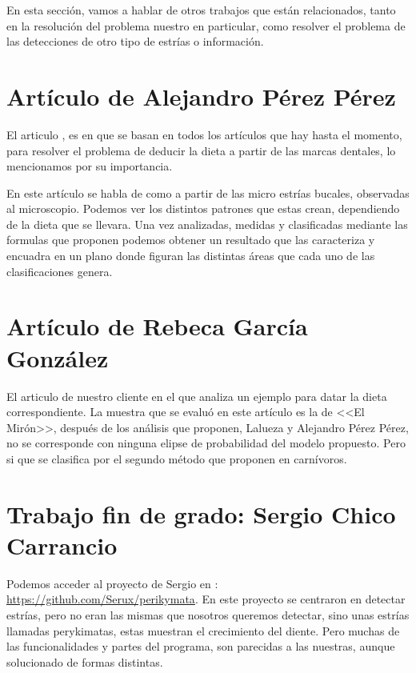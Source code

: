 
En esta sección, vamos a hablar de otros trabajos que están relacionados, tanto en la resolución del problema nuestro en particular, como resolver el problema de las detecciones de otro tipo de estrías o información.

\section{Artículo de Alejandro Pérez Pérez}
El articulo \cite{perez:perez}, es en que se basan en todos los artículos que hay hasta el momento, para resolver el problema de deducir la dieta a partir de las marcas dentales, lo mencionamos por su importancia.

En este artículo se habla de como a partir de las micro estrías bucales, observadas al microscopio. Podemos ver los distintos patrones que estas crean, dependiendo de la dieta que se llevara.
Una vez analizadas, medidas y clasificadas mediante las formulas que proponen podemos obtener un resultado que las caracteriza y encuadra en un plano donde figuran las distintas áreas que cada uno de las clasificaciones genera.

\section{Artículo de Rebeca García González}
El articulo \cite{Rebeca:garcia} de nuestro cliente en el que analiza un ejemplo para datar la dieta correspondiente.
La muestra que se evaluó en este artículo es la de <<El Mirón>>,  después de los análisis que proponen, Lalueza y Alejandro Pérez Pérez, no se corresponde con ninguna elipse de probabilidad del modelo propuesto.
Pero si que se clasifica por el segundo método que proponen en carnívoros.

\section{Trabajo fin de grado: Sergio Chico Carrancio}
Podemos acceder al proyecto de Sergio en : \url{https://github.com/Serux/perikymata}.
En este proyecto se centraron en detectar estrías, pero no eran las mismas que nosotros queremos detectar, sino unas estrías llamadas perykimatas, estas muestran el crecimiento del diente. Pero muchas de las funcionalidades y partes del programa, son parecidas a las nuestras, aunque solucionado de formas distintas.
